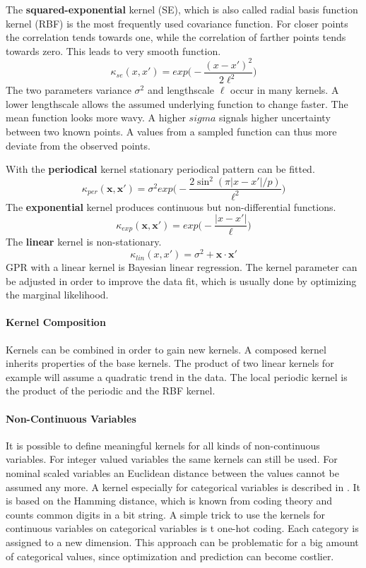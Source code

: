 \documentclass[english]{article}
\newcommand{\x}{\mathbf{x}}
\begin{document}
The \textbf{squared-exponential} kernel (SE), which is also called radial basis function kernel (RBF) is the most frequently used covariance function. For closer points the correlation tends towards one, while the correlation of farther points tends towards zero. This leads to very smooth function.
$$\kappa_{se}(x, x') = exp\bigg(-\frac{(x-x')^2}{2\ell^2}\bigg)$$
The two parameters variance $\sigma^2$ and lengthscale $\ell$ occur in many kernels. A lower lengthscale allows the assumed underlying function to change faster. The mean function looks more wavy. A higher $sigma$ signals higher uncertainty between two known points. A values from a sampled function can thus more deviate from the observed points.

With the \textbf{periodical} kernel stationary periodical pattern can be fitted.
$$\kappa_{per}(\x,\x') = \sigma^2exp\bigg(-\frac{2 \sin^2(\pi|x-x'|/p)}{\ell^2}\bigg)$$
The \textbf{exponential} kernel produces continuous but non-differential functions.
$$\kappa_{exp}(\x,\x') = exp\bigg(-\frac{|x-x'|}{\ell}\bigg)$$
The \textbf{linear} kernel is non-stationary.
$$\kappa_{lin}(x, x') = \sigma^2 + \x\cdot\x'$$
GPR with a linear kernel is Bayesian linear regression.
The kernel parameter can be adjusted in order to improve the data fit, which is usually done by optimizing the marginal likelihood.

\paragraph{Kernel Composition}
Kernels can be combined in order to gain new kernels. A composed kernel inherits properties of the base kernels. The product of two linear kernels for example will assume a quadratic trend in the data. The local periodic kernel is the product of the periodic and the RBF kernel.

\paragraph{Non-Continuous Variables}
It is possible to define meaningful kernels for all kinds of non-continuous variables. For integer valued variables the same kernels can still be used. For nominal scaled variables an Euclidean distance between the values cannot be assumed any more. A kernel especially for categorical variables is described in \cite{hutter_sequential_2011}. It is based on the Hamming distance, which is known from coding theory and counts common digits in a bit string. A simple trick to use the kernels for continuous variables on categorical variables is t one-hot coding. Each category is assigned to a new dimension. This approach can be problematic for a big amount of categorical values, since optimization and prediction can become costlier.
\end{document}

